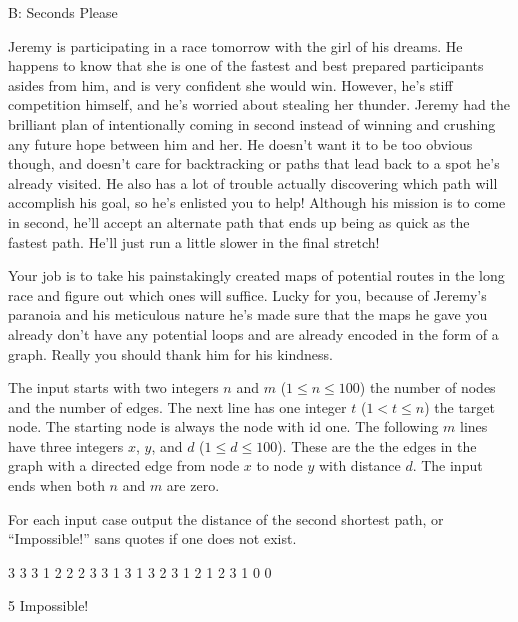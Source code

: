 \begin{problem}{B: Seconds Please}

Jeremy is participating in a race tomorrow with the girl of his dreams.
He happens to know that she is one of the fastest and best prepared participants asides from him, and is very confident she would win.
However, he's stiff competition himself, and he's worried about stealing her thunder.
Jeremy had the brilliant plan of intentionally coming in second instead of winning and crushing any future hope between him and her.
He doesn't want it to be too obvious though, and doesn't care for backtracking or paths that lead back to a spot he's already visited.
He also has a lot of trouble actually discovering which path will accomplish his goal, so he's enlisted you to help!
Although his mission is to come in second, he'll accept an alternate path that ends up being as quick as the fastest path.
He'll just run a little slower in the final stretch!

Your job is to take his painstakingly created maps of potential routes in the long race and figure out which ones will suffice.
Lucky for you, because of Jeremy's paranoia and his meticulous nature he's made sure that the maps he gave you already don't have any potential loops and are already encoded in the form of a graph.
Really you should thank him for his kindness.

\end{problem}

\begin{formalin}
The input starts with two integers $n$ and $m$ ($1 \leq n \leq 100$) the number of nodes and the number of edges.
The next line has one integer $t$ ($1 < t \leq n$) the target node.
The starting node is always the node with id one.
The following $m$ lines have three integers $x$, $y$, and $d$ ($1 \leq d \leq 100$).
These are the the edges in the graph with a directed edge from node $x$ to node $y$ with distance $d$.
The input ends when both $n$ and $m$ are zero.
\end{formalin}

\begin{formalout}
For each input case output the distance of the second shortest path, or ``Impossible!'' sans quotes if one does not exist.
\end{formalout}

\begin{datain}
3 3
3
1 2 2
2 3 3
1 3 1
3 2
3
1 2 1
2 3 1
0 0
\end{datain}

\begin{dataout}
5
Impossible!
\end{dataout}

